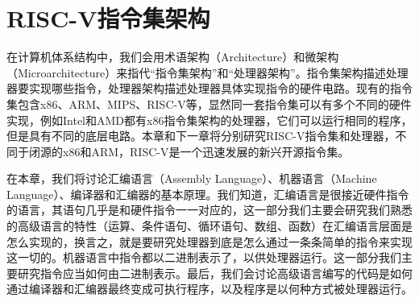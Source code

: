 \chapter{RISC-V指令集架构}

在计算机体系结构中，我们会用术语架构（Architecture）和微架构（Microarchitecture）来指代“指令集架构”和“处理器架构”。指令集架构描述处理器要实现哪些指令，处理器架构描述处理器具体实现指令的硬件电路。现有的指令集包含x86、ARM、MIPS、RISC-V等，显然同一套指令集可以有多个不同的硬件实现，例如Intel和AMD都有x86指令集架构的处理器，它们可以运行相同的程序，但是具有不同的底层电路。本章和下一章将分别研究RISC-V指令集和处理器，不同于闭源的x86和ARM，RISC-V是一个迅速发展的新兴开源指令集。

在本章，我们将讨论汇编语言（Assembly Language）、机器语言（Machine Language）、编译器和汇编器的基本原理。我们知道，汇编语言是很接近硬件指令的语言，其语句几乎是和硬件指令一一对应的，这一部分我们主要会研究我们熟悉的高级语言的特性（运算、条件语句、循环语句、数组、函数）在汇编语言层面是怎么实现的，换言之，就是要研究处理器到底是怎么通过一条条简单的指令来实现这一切的。机器语言中指令都以二进制表示了，以供处理器运行。这一部分我们主要研究指令应当如何由二进制表示。最后，我们会讨论高级语言编写的代码是如何通过编译器和汇编器最终变成可执行程序，以及程序是以何种方式被处理器运行。


